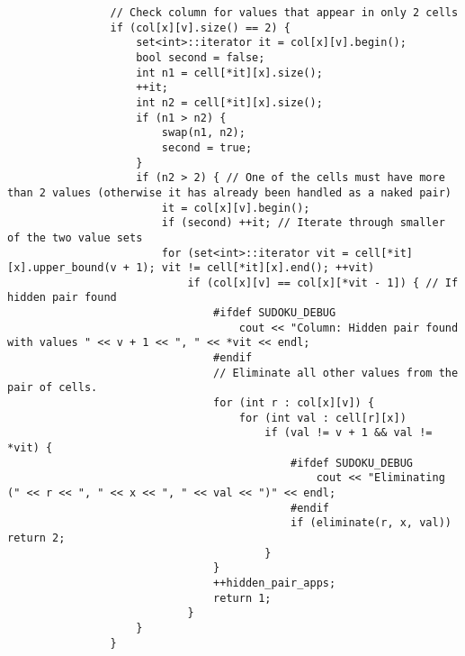 \documentclass{article}
\begin{document}
\begin{lstlisting}
                // Check column for values that appear in only 2 cells
                if (col[x][v].size() == 2) {
                    set<int>::iterator it = col[x][v].begin();
                    bool second = false;
                    int n1 = cell[*it][x].size();
                    ++it;
                    int n2 = cell[*it][x].size();
                    if (n1 > n2) {
                        swap(n1, n2);
                        second = true;
                    }
                    if (n2 > 2) { // One of the cells must have more than 2 values (otherwise it has already been handled as a naked pair)
                        it = col[x][v].begin();
                        if (second) ++it; // Iterate through smaller of the two value sets
                        for (set<int>::iterator vit = cell[*it][x].upper_bound(v + 1); vit != cell[*it][x].end(); ++vit)
                            if (col[x][v] == col[x][*vit - 1]) { // If hidden pair found
                                #ifdef SUDOKU_DEBUG
                                    cout << "Column: Hidden pair found with values " << v + 1 << ", " << *vit << endl;
                                #endif
                                // Eliminate all other values from the pair of cells.
                                for (int r : col[x][v]) {
                                    for (int val : cell[r][x])
                                        if (val != v + 1 && val != *vit) {
                                            #ifdef SUDOKU_DEBUG
                                                cout << "Eliminating (" << r << ", " << x << ", " << val << ")" << endl;
                                            #endif
                                            if (eliminate(r, x, val)) return 2;
                                        }
                                }
                                ++hidden_pair_apps;
                                return 1;
                            }
                    }
                }


\end{lstlisting}
\end{document}
